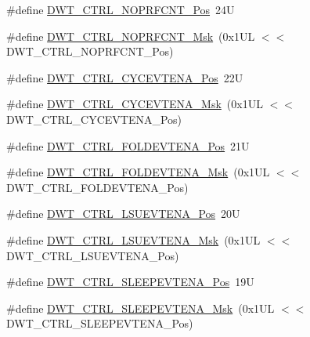 \begin{DoxyCompactItemize}
\item 
\#define \mbox{\hyperlink{group___c_m_s_i_s___d_w_t_gad52a0e5be84363ab166cc17beca0d048}{D\+W\+T\+\_\+\+C\+T\+R\+L\+\_\+\+N\+O\+P\+R\+F\+C\+N\+T\+\_\+\+Pos}}~24U
\item 
\#define \mbox{\hyperlink{group___c_m_s_i_s___d_w_t_gafd8448d7db4bc51f27f202e6e1f27823}{D\+W\+T\+\_\+\+C\+T\+R\+L\+\_\+\+N\+O\+P\+R\+F\+C\+N\+T\+\_\+\+Msk}}~(0x1\+U\+L $<$$<$ D\+W\+T\+\_\+\+C\+T\+R\+L\+\_\+\+N\+O\+P\+R\+F\+C\+N\+T\+\_\+\+Pos)
\item 
\#define \mbox{\hyperlink{group___c_m_s_i_s___d_w_t_ga0cb0640aaeb18a626d7823570d5c3cb6}{D\+W\+T\+\_\+\+C\+T\+R\+L\+\_\+\+C\+Y\+C\+E\+V\+T\+E\+N\+A\+\_\+\+Pos}}~22U
\item 
\#define \mbox{\hyperlink{group___c_m_s_i_s___d_w_t_ga40554bd81460e39abf08810f45fac1a2}{D\+W\+T\+\_\+\+C\+T\+R\+L\+\_\+\+C\+Y\+C\+E\+V\+T\+E\+N\+A\+\_\+\+Msk}}~(0x1\+U\+L $<$$<$ D\+W\+T\+\_\+\+C\+T\+R\+L\+\_\+\+C\+Y\+C\+E\+V\+T\+E\+N\+A\+\_\+\+Pos)
\item 
\#define \mbox{\hyperlink{group___c_m_s_i_s___d_w_t_ga5602b0707f446ce78d88ff2a3a82bfff}{D\+W\+T\+\_\+\+C\+T\+R\+L\+\_\+\+F\+O\+L\+D\+E\+V\+T\+E\+N\+A\+\_\+\+Pos}}~21U
\item 
\#define \mbox{\hyperlink{group___c_m_s_i_s___d_w_t_ga717e679d775562ae09185a3776b1582f}{D\+W\+T\+\_\+\+C\+T\+R\+L\+\_\+\+F\+O\+L\+D\+E\+V\+T\+E\+N\+A\+\_\+\+Msk}}~(0x1\+U\+L $<$$<$ D\+W\+T\+\_\+\+C\+T\+R\+L\+\_\+\+F\+O\+L\+D\+E\+V\+T\+E\+N\+A\+\_\+\+Pos)
\item 
\#define \mbox{\hyperlink{group___c_m_s_i_s___d_w_t_gaea5d1ee72188dc1d57b54c60a9f5233e}{D\+W\+T\+\_\+\+C\+T\+R\+L\+\_\+\+L\+S\+U\+E\+V\+T\+E\+N\+A\+\_\+\+Pos}}~20U
\item 
\#define \mbox{\hyperlink{group___c_m_s_i_s___d_w_t_gac47427f455fbc29d4b6f8a479169f2b2}{D\+W\+T\+\_\+\+C\+T\+R\+L\+\_\+\+L\+S\+U\+E\+V\+T\+E\+N\+A\+\_\+\+Msk}}~(0x1\+U\+L $<$$<$ D\+W\+T\+\_\+\+C\+T\+R\+L\+\_\+\+L\+S\+U\+E\+V\+T\+E\+N\+A\+\_\+\+Pos)
\item 
\#define \mbox{\hyperlink{group___c_m_s_i_s___d_w_t_ga9c6d62d121164013a8e3ee372f17f3e5}{D\+W\+T\+\_\+\+C\+T\+R\+L\+\_\+\+S\+L\+E\+E\+P\+E\+V\+T\+E\+N\+A\+\_\+\+Pos}}~19U
\item 
\#define \mbox{\hyperlink{group___c_m_s_i_s___d_w_t_ga2f431b3734fb840daf5b361034856da9}{D\+W\+T\+\_\+\+C\+T\+R\+L\+\_\+\+S\+L\+E\+E\+P\+E\+V\+T\+E\+N\+A\+\_\+\+Msk}}~(0x1\+U\+L $<$$<$ D\+W\+T\+\_\+\+C\+T\+R\+L\+\_\+\+S\+L\+E\+E\+P\+E\+V\+T\+E\+N\+A\+\_\+\+Pos)
\item 
$$
\end{DoxyCompactItemize}
